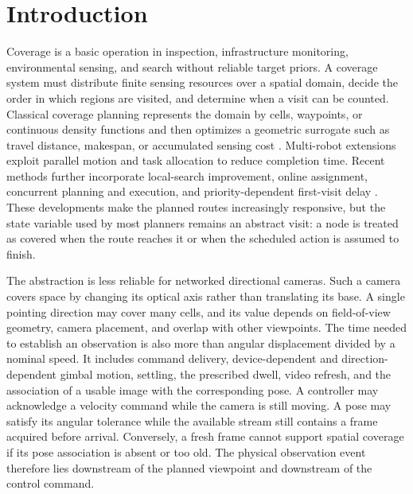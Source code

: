 \section{Introduction}\label{sec:introduction}

Coverage is a basic operation in inspection, infrastructure monitoring, environmental sensing, and search without reliable target priors. A coverage system must distribute finite sensing resources over a spatial domain, decide the order in which regions are visited, and determine when a visit can be counted. Classical coverage planning represents the domain by cells, waypoints, or continuous density functions and then optimizes a geometric surrogate such as travel distance, makespan, or accumulated sensing cost \cite{cortes2004coverage,galceran2013survey,tan2021review}. Multi-robot extensions exploit parallel motion and task allocation to reduce completion time. Recent methods further incorporate local-search improvement, online assignment, concurrent planning and execution, and priority-dependent first-visit delay \cite{wang2024apfcpp,wang2025macplanner,mitra2024ondemand,mitra2025concurrent,lee2026priority}. These developments make the planned routes increasingly responsive, but the state variable used by most planners remains an abstract visit: a node is treated as covered when the route reaches it or when the scheduled action is assumed to finish.

The abstraction is less reliable for networked directional cameras. Such a camera covers space by changing its optical axis rather than translating its base. A single pointing direction may cover many cells, and its value depends on field-of-view geometry, camera placement, and overlap with other viewpoints. The time needed to establish an observation is also more than angular displacement divided by a nominal speed. It includes command delivery, device-dependent and direction-dependent gimbal motion, settling, the prescribed dwell, video refresh, and the association of a usable image with the corresponding pose. A controller may acknowledge a velocity command while the camera is still moving. A pose may satisfy its angular tolerance while the available stream still contains a frame acquired before arrival. Conversely, a fresh frame cannot support spatial coverage if its pose association is absent or too old. The physical observation event therefore lies downstream of the planned viewpoint and downstream of the control command.

